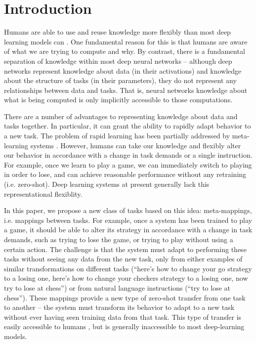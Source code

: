\documentclass{article}
\begin{document}
\section{Introduction}
Humans are able to use and reuse knowledge more flexibly than most deep learning models can \citep[e.g.][]{Lake2016, Marcus2018}. One fundamental reason for this is that humans are aware of what we are trying to compute and why. By contrast, there is a fundamental separation of knowledge within most deep neural networks -- although deep networks represent knowledge about data (in their activations) and knowledge about the structure of tasks (in their parameters), they do not represent any relationships between data and tasks. That is, neural networks knowledge about what is being computed is only implicitly accessible to those computations. \par
There are a number of advantages to representing knowledge about data and tasks together. In particular, it can grant the ability to rapidly adapt behavior to a new task. The problem of rapid learning has been partially addressed by meta-learning systems \citep[e.g.][]{Vinyals2016, Finn2017a}. However, humans can take our knowledge and flexibly alter our behavior in accordance with a change in task demands or a single instruction. For example, once we learn to play a game, we can immediately switch to playing in order to lose, and can achieve reasonable performance without any retraining (i.e. zero-shot). Deep learning systems at present generally lack this representational flexiblity. \par
In this paper, we propose a new class of tasks based on this idea: meta-mappings, i.e. mappings between tasks. For example, once a system has been trained to play a game, it should be able to alter its strategy in accordance with a change in task demands, such as trying to lose the game, or trying to play without using a certain action. The challenge is that the system must adapt to performing these tasks without seeing any data from the new task, only from either examples of similar transformations on different tasks (``here's how to change your go strategy to a losing one, here's how to change your checkers strategy to a losing one, now try to lose at chess'') or from natural language instructions (``try to lose at chess''). These mappings provide a new type of zero-shot transfer from one task to another -- the system must transform its behavior to adapt to a new task without ever having seen training data from that task. This type of transfer is easily accessible to humans \citep{Lake2016}, but is generally inaccessible to most deep-learning models. \par
\end{document}
